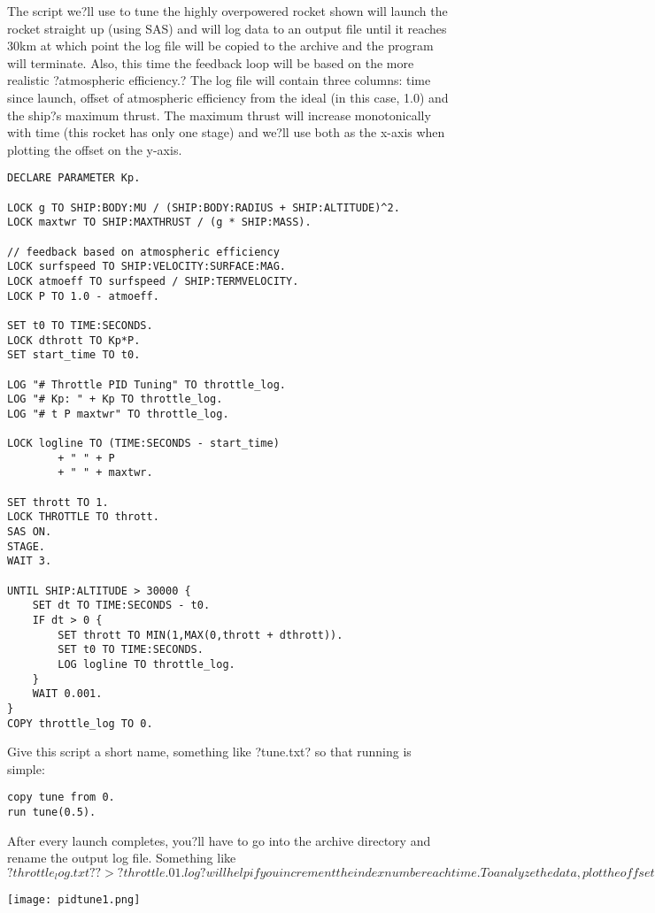 The script we?ll use to tune the highly overpowered rocket shown will launch the rocket straight up (using SAS) and will log data to an output file until it reaches 30km at which point the log file will be copied to the archive and the program will terminate. Also, this time the feedback loop will be based on the more realistic ?atmospheric efficiency.? The log file will contain three columns: time since launch, offset of atmospheric efficiency from the ideal (in this case, 1.0) and the ship?s maximum thrust. The maximum thrust will increase monotonically with time (this rocket has only one stage) and we?ll use both as the x-axis when plotting the offset on the y-axis.

\begin{Verbatim}[frame=single]
DECLARE PARAMETER Kp.

LOCK g TO SHIP:BODY:MU / (SHIP:BODY:RADIUS + SHIP:ALTITUDE)^2.
LOCK maxtwr TO SHIP:MAXTHRUST / (g * SHIP:MASS).

// feedback based on atmospheric efficiency
LOCK surfspeed TO SHIP:VELOCITY:SURFACE:MAG.
LOCK atmoeff TO surfspeed / SHIP:TERMVELOCITY.
LOCK P TO 1.0 - atmoeff.

SET t0 TO TIME:SECONDS.
LOCK dthrott TO Kp*P.
SET start_time TO t0.

LOG "# Throttle PID Tuning" TO throttle_log.
LOG "# Kp: " + Kp TO throttle_log.
LOG "# t P maxtwr" TO throttle_log.

LOCK logline TO (TIME:SECONDS - start_time)
        + " " + P
        + " " + maxtwr.

SET thrott TO 1.
LOCK THROTTLE TO thrott.
SAS ON.
STAGE.
WAIT 3.

UNTIL SHIP:ALTITUDE > 30000 {
    SET dt TO TIME:SECONDS - t0.
    IF dt > 0 {
        SET thrott TO MIN(1,MAX(0,thrott + dthrott)).
        SET t0 TO TIME:SECONDS.
        LOG logline TO throttle_log.
    }
    WAIT 0.001.
}
COPY throttle_log TO 0.
\end{Verbatim} 

Give this script a short name, something like ?tune.txt? so that running is simple:

\begin{Verbatim}[frame=single]
copy tune from 0.
run tune(0.5).
\end{Verbatim} 

After every launch completes, you?ll have to go into the archive directory and rename the output log file. Something like $?throttle_log.txt? ?> ?throttle.01.log? will help if you increment the index number each time. To analyze the data, plot the offset (P) as a function of time (t). Here, we show the results for three values of Kp: 0.002, 0.016 and 0.160, including the maximum TWR when Kp = 0.002 as the top x-axis. The maximum TWR dependence on time is different for the three values of Kp, but not by a lot.
$
\begin{center}
\texttt{[image: pidtune1.png]}
\end{center}

